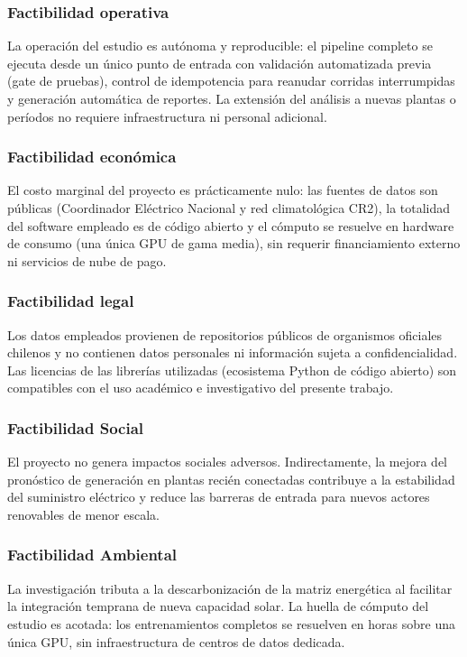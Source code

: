 \subsubsection{Factibilidad operativa}
La operación del estudio es autónoma y reproducible: el pipeline completo se ejecuta desde un único punto de entrada con validación automatizada previa (gate de pruebas), control de idempotencia para reanudar corridas interrumpidas y generación automática de reportes. La extensión del análisis a nuevas plantas o períodos no requiere infraestructura ni personal adicional.

\subsubsection{Factibilidad económica}
El costo marginal del proyecto es prácticamente nulo: las fuentes de datos son públicas (Coordinador Eléctrico Nacional y red climatológica CR2), la totalidad del software empleado es de código abierto y el cómputo se resuelve en hardware de consumo (una única GPU de gama media), sin requerir financiamiento externo ni servicios de nube de pago.

\subsubsection{Factibilidad legal}
Los datos empleados provienen de repositorios públicos de organismos oficiales chilenos y no contienen datos personales ni información sujeta a confidencialidad. Las licencias de las librerías utilizadas (ecosistema Python de código abierto) son compatibles con el uso académico e investigativo del presente trabajo.

\subsubsection{Factibilidad Social}
El proyecto no genera impactos sociales adversos. Indirectamente, la mejora del pronóstico de generación en plantas recién conectadas contribuye a la estabilidad del suministro eléctrico y reduce las barreras de entrada para nuevos actores renovables de menor escala.

\subsubsection{Factibilidad Ambiental}
La investigación tributa a la descarbonización de la matriz energética al facilitar la integración temprana de nueva capacidad solar. La huella de cómputo del estudio es acotada: los entrenamientos completos se resuelven en horas sobre una única GPU, sin infraestructura de centros de datos dedicada.